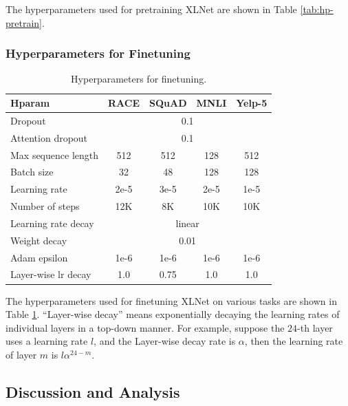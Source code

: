 The hyperparameters used for pretraining XLNet are shown in Table \ref{tab:hp-pretrain}.

\subsubsection{Hyperparameters for Finetuning}

\begin{table}[h!]
  \small
  \centering
  
  \begin{tabular}{lcccc}
    \toprule
    \bf Hparam & \bf RACE & \bf SQuAD & \bf MNLI & \bf Yelp-5 \\
    \midrule
    Dropout             & \multicolumn{4}{c}{0.1}    \\
    Attention dropout   & \multicolumn{4}{c}{0.1}    \\
    Max sequence length & 512  & 512  & 128  & 512   \\
    Batch size          & 32   & 48   & 128  & 128   \\
    Learning rate       & 2e-5 & 3e-5 & 2e-5 & 1e-5  \\
    Number of steps     & 12K  & 8K   & 10K  & 10K   \\
    Learning rate decay & \multicolumn{4}{c}{linear} \\
    Weight decay        & \multicolumn{4}{c}{0.01}   \\
    Adam epsilon        & 1e-6 & 1e-6 & 1e-6 & 1e-6  \\
    Layer-wise lr decay & 1.0  & 0.75 & 1.0  & 1.0   \\
    \bottomrule
  \end{tabular}
  \caption{\small
    Hyperparameters for finetuning.
  }
  \label{tab:hp-finetune}
  \vspace{-1em}
\end{table}

The hyperparameters used for finetuning XLNet on various tasks are shown in Table \ref{tab:hp-finetune}. ``Layer-wise decay'' means exponentially decaying the learning rates of individual layers in a top-down manner. For example, suppose the $24$-th layer uses a learning rate $l$, and the Layer-wise decay rate is $\alpha$, then the learning rate of layer $m$ is $l \alpha^{24 - m}$.


\subsection{Discussion and Analysis}
\label{sec:discussion}
